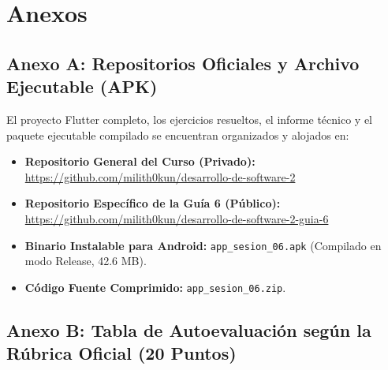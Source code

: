 \documentclass[12pt,a4paper]{article}
\begin{document}
\section{Anexos}

\subsection{Anexo A: Repositorios Oficiales y Archivo Ejecutable (APK)}
El proyecto Flutter completo, los ejercicios resueltos, el informe técnico y el paquete ejecutable compilado se encuentran organizados y alojados en:
\begin{itemize}[leftmargin=*]
    \item \textbf{Repositorio General del Curso (Privado):} \url{https://github.com/milith0kun/desarrollo-de-software-2}
    \item \textbf{Repositorio Específico de la Guía 6 (Público):} \url{https://github.com/milith0kun/desarrollo-de-software-2-guia-6}
    \item \textbf{Binario Instalable para Android:} \texttt{app\_sesion\_06.apk} (Compilado en modo Release, 42.6 MB).
    \item \textbf{Código Fuente Comprimido:} \texttt{app\_sesion\_06.zip}.
\end{itemize}

\subsection{Anexo B: Tabla de Autoevaluación según la Rúbrica Oficial (20 Puntos)}
\end{document}
